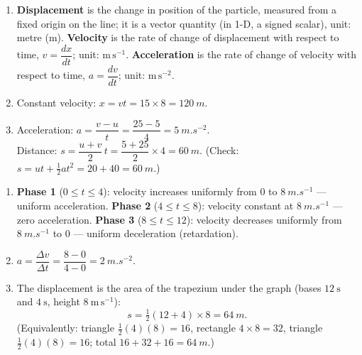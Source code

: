 \documentclass[11pt]{article}
\begin{document}
\begin{corrige}
\begin{enumerate}
\item \textbf{Displacement} is the change in position of the particle, measured from a fixed origin on the line; it is a vector quantity (in 1-D, a signed scalar), unit: metre (m). \textbf{Velocity} is the rate of change of displacement with respect to time, $v = \dfrac{dx}{dt}$; unit: $\mathrm{m\,s^{-1}}$. \textbf{Acceleration} is the rate of change of velocity with respect to time, $a = \dfrac{dv}{dt}$; unit: $\mathrm{m\,s^{-2}}$.
\item Constant velocity: $x = vt = 15 \times 8 = \SI{120}{m}$.
\item Acceleration: $a = \dfrac{v-u}{t} = \dfrac{25-5}{4} = \SI{5}{m.s^{-2}}$.\\
Distance: $s = \dfrac{u+v}{2}\,t = \dfrac{5+25}{2}\times 4 = \SI{60}{m}$. (Check: $s = ut + \tfrac12 at^2 = 20 + 40 = \SI{60}{m}$.)
\end{enumerate}
\end{corrige}

\begin{corrige}
\begin{enumerate}
\item \textbf{Phase 1} ($0 \le t \le 4$): velocity increases uniformly from $0$ to $\SI{8}{m.s^{-1}}$ — uniform acceleration. \textbf{Phase 2} ($4 \le t \le 8$): velocity constant at $\SI{8}{m.s^{-1}}$ — zero acceleration. \textbf{Phase 3} ($8 \le t \le 12$): velocity decreases uniformly from $\SI{8}{m.s^{-1}}$ to $0$ — uniform deceleration (retardation).
\item $a = \dfrac{\Delta v}{\Delta t} = \dfrac{8-0}{4-0} = \SI{2}{m.s^{-2}}$.
\item The displacement is the area of the trapezium under the graph (bases $12\ \mathrm{s}$ and $4\ \mathrm{s}$, height $8\ \mathrm{m\,s^{-1}}$):
\[
s = \tfrac12(12+4)\times 8 = \SI{64}{m}.
\]
(Equivalently: triangle $\tfrac12(4)(8)=16$, rectangle $4\times 8 = 32$, triangle $\tfrac12(4)(8)=16$; total $16+32+16=\SI{64}{m}$.)
\end{enumerate}
\end{corrige}
\end{document}
